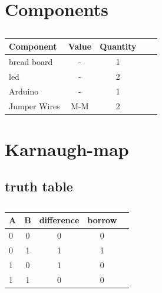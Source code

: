 \documentclass[10pt, a4paper]{article}
\title{\mytitle}
\author{\myauthor\hspace{1em}\\\contact\\IITH\hspace{0.5em}-\hspace{0.5em}\mymodule}
\date{}
\begin{document}
 \maketitle
\begin{abstract}
 \paragraph{ Half Subtractor (HS)}: Half subtractor is a combination circuit with two inputs and two outputs which is difference and borrow. It produces the difference between the two binary bits at the input and also produces an output (Borrow)
 \end{abstract}
\section{Components}
\begin{table}[htbp]
 \begin{center}
    \begin{tabular}{|l|c|c|c|c|} \hline
  \textbf{Component}& \textbf{Value} & \textbf{Quantity} \\
 \hline
 bread board& - & 1 \\ \hline
led &  - & 2 \\ \hline
Arduino & - & 1 \\ \hline
Jumper Wires & M-M & 2  \\ \hline
\end{tabular}  
\end{center}
\caption{\label{table:dummytable}}
\end{table}
 \section{Karnaugh-map}
 \subsection{truth table} 
 \begin{table}[htbp]
 \begin{center}
    \begin{tabular}{|l|c|c|c|c|} \hline
  \textbf{A}& \textbf{B} & \textbf{difference}& \textbf{borrow}\\
 \hline
 0&0&0&0\\ \hline
0&1&1&1 \\ \hline
1&0&1&0\\ \hline
1&1&0&0\\ \hline
\end{tabular}  
\end{center}
\caption{\label{table:dummytable} }
\end{table}
\end{document}
